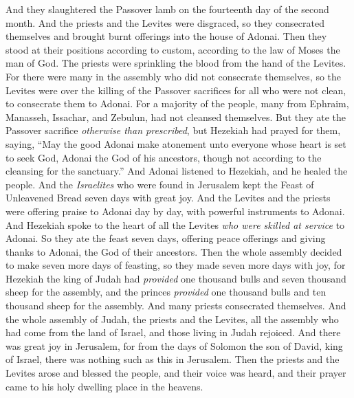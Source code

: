 \begin{biblechapter}
\verse And they slaughtered the Passover lamb on the fourteenth day of the second month. And the priests and the Levites were disgraced, so they consecrated themselves and brought burnt offerings into the house of Adonai.
\verse Then they stood at their positions according to custom, according to the law of Moses the man of God. The priests were sprinkling the blood from the hand of the Levites.
\verse For there were many in the assembly who did not consecrate themselves, so the Levites were over the killing of the Passover sacrifices for all who were not clean, to consecrate them to Adonai.
\verse For a majority of the people, many from Ephraim, Manasseh, Issachar, and Zebulun, had not cleansed themselves. But they ate the Passover sacrifice \textit{otherwise than prescribed}, but Hezekiah had prayed for them, saying, “May the good Adonai make atonement unto
\verse everyone whose heart is set to seek God, Adonai the God of his ancestors, though not according to the cleansing for the sanctuary.”
\verse And Adonai listened to Hezekiah, and he healed the people.
\verse And the \textit{Israelites} who were found in Jerusalem kept the Feast of Unleavened Bread seven days with great joy. And the Levites and the priests were offering praise to Adonai day by day, with powerful instruments to Adonai.
\verse And Hezekiah spoke to the heart of all the Levites \textit{who were skilled at service} to Adonai. So they ate the feast seven days, offering peace offerings and giving thanks to Adonai, the God of their ancestors.
\verse Then the whole assembly decided to make seven more days of feasting, so they made seven more days with joy,
\verse for Hezekiah the king of Judah had \textit{provided} one thousand bulls and seven thousand sheep for the assembly, and the princes \textit{provided} one thousand bulls and ten thousand sheep for the assembly. And many priests consecrated themselves.
\verse And the whole assembly of Judah, the priests and the Levites, all the assembly who had come from the land of Israel, and those living in Judah rejoiced.
\verse And there was great joy in Jerusalem, for from the days of Solomon the son of David, king of Israel, there was nothing such as this in Jerusalem.
\verse Then the priests and the Levites arose and blessed the people, and their voice was heard, and their prayer came to his holy dwelling place in the heavens.
\end{biblechapter}

